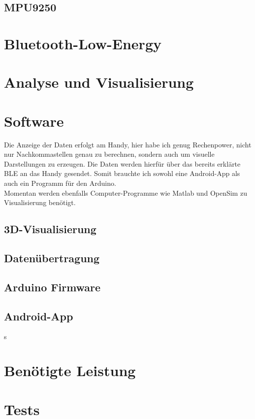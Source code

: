 \documentclass[11pt, titlepage, parskip=half-]{scrreprt}
\begin{document}
\section{MPU9250}


\chapter{Bluetooth-Low-Energy}


\chapter{Analyse und Visualisierung}


\chapter{Software}
Die Anzeige der Daten erfolgt am Handy, hier habe ich genug Rechenpower,
nicht nur Nachkommastellen genau zu berechnen, sondern auch um 
visuelle Darstellungen zu erzeugen. Die Daten werden hierfür über das bereits
erklärte BLE an das Handy gesendet.
Somit brauchte ich sowohl eine Android-App als auch ein Programm für den Arduino. \\ 
Momentan werden ebenfalls Computer-Programme wie Matlab und OpenSim zu Visualisierung benötigt.
\section{3D-Visualisierung}

\section{Datenübertragung}

\section{Arduino Firmware}

\section{Android-App}
s
\chapter{Benötigte Leistung}


\chapter{Tests}

%
%
\end{document}
